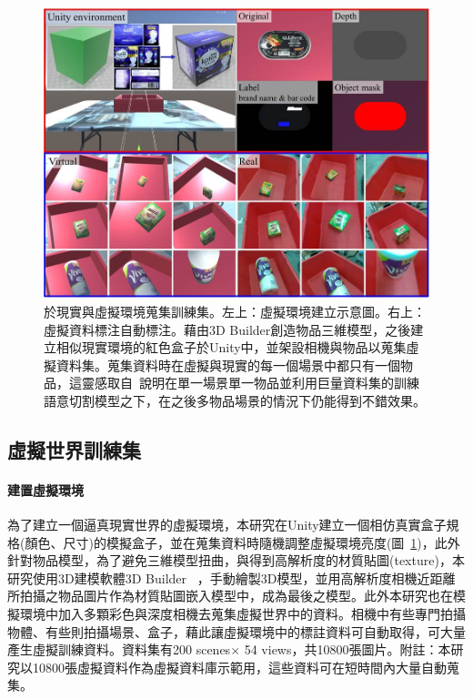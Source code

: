 \begin{figure}[ht]
	\centering
	\includegraphics[height=!, width=1.0\linewidth, keepaspectratio=true]
	{./figures/real_and_vir_environment.jpg}
  \caption{於現實與虛擬環境蒐集訓練集。左上：虛擬環境建立示意圖。右上：虛擬資料標注自動標注。藉由3D Builder創造物品三維模型，之後建立相似現實環境的紅色盒子於Unity中，並架設相機與物品以蒐集虛擬資料集。蒐集資料時在虛擬與現實的每一個場景中都只有一個物品，這靈感取自~\cite{zeng2016multi}說明在單一場景單一物品並利用巨量資料集的訓練語意切割模型之下，在之後多物品場景的情況下仍能得到不錯效果。}
  \label{figure:benchmark-dataset}
\end{figure}

\subsection{虛擬世界訓練集}
\paragraph{建置虛擬環境}
為了建立一個逼真現實世界的虛擬環境，本研究在Unity建立一個相仿真實盒子規格(顏色、尺寸)的模擬盒子，並在蒐集資料時隨機調整虛擬環境亮度(圖~\ref{figure:benchmark-dataset})，此外針對物品模型，為了避免三維模型扭曲，與得到高解析度的材質貼圖(texture)，本研究使用3D建模軟體3D Builder ~\cite{3DBuilder}，手動繪製3D模型，並用高解析度相機近距離所拍攝之物品圖片作為材質貼圖嵌入模型中，成為最後之模型。此外本研究也在模擬環境中加入多顆彩色與深度相機去蒐集虛擬世界中的資料。相機中有些專門拍攝物體、有些則拍攝場景、盒子，藉此讓虛擬環境中的標註資料可自動取得，可大量產生虛擬訓練資料。資料集有200 scenes$\times$ 54 views，共10800張圖片。附註：本研究以10800張虛擬資料作為虛擬資料庫示範用，這些資料可在短時間內大量自動蒐集。

